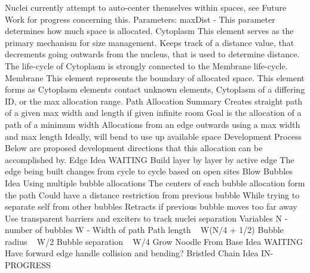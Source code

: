 \documentclass[article]{memoir}
\begin{document}
Nuclei currently attempt to auto-center themselves within spaces, see Future Work for progress concerning this.
Parameters:
maxDist - This parameter determines how much space is allocated.
Cytoplasm
This element serves as the primary mechanism for size management.
Keeps track of a distance value, that decrements going outwards from the nucleus, that is used to determine distance.
The life-cycle of Cytoplasm is strongly connected to the Membrane life-cycle.
Membrane
This element represents the boundary of allocated space.
This element forms as Cytoplasm elements contact unknown elements, Cytoplasm of a differing ID, or the max allocation range.
Path Allocation
Summary
Creates straight path of a given max width and length if given infinite room
Goal is the allocation of a path of a minimum width
Allocations from an edge outwards using a max width and max length
Ideally, will bend to use up available space
Development Process
Below are proposed development directions that this allocation can be accomplished by.
Edge Idea
WAITING
Build layer by layer by active edge
The edge being built changes from cycle to cycle based on open sites
Blow Bubbles Idea
Using multiple bubble allocations
The centers of each bubble allocation form the path
Could have a distance restriction from previous bubble
While trying to separate self from other bubbles
Retracts if previous bubble moves too far away
Use transparent barriers and exciters to track nuclei separation
Variables
N - number of bubbles
W - Width of path
Path length ~ W(N/4 + 1/2)
Bubble radius ~ W/2
Bubble separation ~ W/4
Grow Noodle From Base Idea
WAITING
Have forward edge handle collision and bending?
Bristled Chain Idea
IN-PROGRESS
\end{document}
